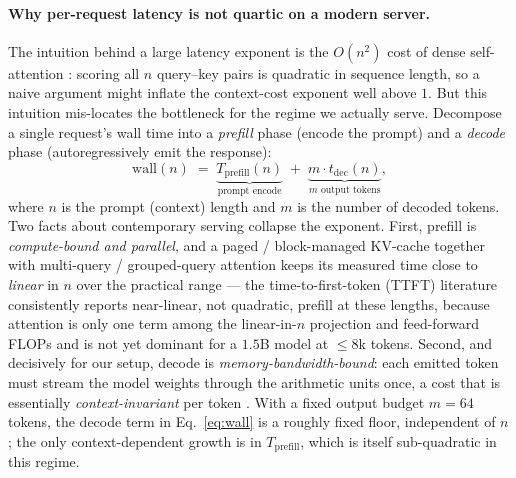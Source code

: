 \documentclass[11pt,a4paper]{article}
\newcommand{\ctx}{\ensuremath{n}}
\begin{document}
\paragraph{Why per-request latency is not quartic on a modern server.}
The intuition behind a large latency exponent is the \(O(n^2)\) cost of dense
self-attention \citep{vaswani2017attention}: scoring all \(n\) query--key pairs
is quadratic in sequence length, so a naive argument might inflate the
context-cost exponent well above \(1\). But this intuition mis-locates the
bottleneck for the regime we actually serve. Decompose a single request's wall
time into a \emph{prefill} phase (encode the prompt) and a \emph{decode} phase
(autoregressively emit the response):
\begin{equation}
\label{eq:wall}
\mathrm{wall}(\ctx) \;=\; \underbrace{T_{\mathrm{prefill}}(\ctx)}_{\text{prompt encode}}
\;+\; \underbrace{m \cdot t_{\mathrm{dec}}(\ctx)}_{\text{$m$ output tokens}} ,
\end{equation}
where \(\ctx\) is the prompt (context) length and \(m\) is the number of decoded
tokens. Two facts about contemporary serving collapse the exponent. First,
prefill is \emph{compute-bound and parallel}, and a paged / block-managed
KV-cache \citep{kwon2023vllm} together with multi-query / grouped-query
attention \citep{pope2022efficiently} keeps its measured time close to
\emph{linear} in \(\ctx\) over the practical range --- the time-to-first-token
(TTFT) literature consistently reports near-linear, not quadratic, prefill at
these lengths, because attention is only one term among the linear-in-\(\ctx\)
projection and feed-forward FLOPs and is not yet dominant for a \(1.5\)B model
at \(\le\!8\)k tokens. Second, and decisively for our setup, decode is
\emph{memory-bandwidth-bound}: each emitted token must stream the model weights
through the arithmetic units once, a cost that is essentially
\emph{context-invariant} per token \citep{pope2022efficiently}. With a fixed
output budget \(m = 64\) tokens, the decode term in Eq.~\eqref{eq:wall} is a
roughly fixed floor, independent of \(\ctx\); the only context-dependent growth
is in \(T_{\mathrm{prefill}}\), which is itself sub-quadratic in this regime.
\end{document}

